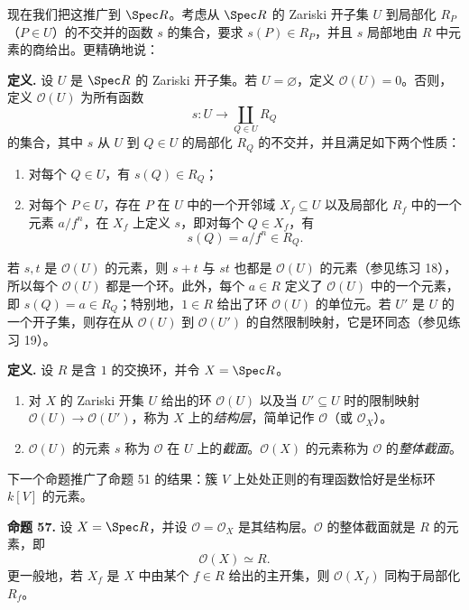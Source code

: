 现在我们把这推广到 $\Spec R$。考虑从 $\Spec R$ 的 Zariski 开子集 $U$ 到局部化 $R_P$（$P\in U$）的不交并的函数 $s$ 的集合，要求 $s(P)\in R_P$，并且 $s$ 局部地由 $R$ 中元素的商给出。更精确地说：

\noindent\textbf{定义.} 设 $U$ 是 $\Spec R$ 的 Zariski 开子集。若 $U=\varnothing$，定义 $\mathcal O(U)=0$。否则，定义 $\mathcal O(U)$ 为所有函数
\[
s:U\longrightarrow\coprod_{Q\in U}R_Q
\]
的集合，其中 $s$ 从 $U$ 到 $Q\in U$ 的局部化 $R_Q$ 的不交并，并且满足如下两个性质：
\begin{enumerate}[label=(\arabic*)]
	\item 对每个 $Q\in U$，有 $s(Q)\in R_Q$；
	\item 对每个 $P\in U$，存在 $P$ 在 $U$ 中的一个开邻域 $X_f\subseteq U$ 以及局部化 $R_f$ 中的一个元素 $a/f^n$，在 $X_f$ 上定义 $s$，即对每个 $Q\in X_f$，有
	\[
	s(Q)=a/f^n\in R_Q.
	\]
\end{enumerate}

若 $s,t$ 是 $\mathcal O(U)$ 的元素，则 $s+t$ 与 $st$ 也都是 $\mathcal O(U)$ 的元素（参见练习 18），所以每个 $\mathcal O(U)$ 都是一个环。此外，每个 $a\in R$ 定义了 $\mathcal O(U)$ 中的一个元素，即 $s(Q)=a\in R_Q$；特别地，$1\in R$ 给出了环 $\mathcal O(U)$ 的单位元。若 $U'$ 是 $U$ 的一个开子集，则存在从 $\mathcal O(U)$ 到 $\mathcal O(U')$ 的自然限制映射，它是环同态（参见练习 19）。

\noindent\textbf{定义.} 设 $R$ 是含 $1$ 的交换环，并令 $X=\Spec R$。
\begin{enumerate}[label=(\arabic*)]
	\item 对 $X$ 的 Zariski 开集 $U$ 给出的环 $\mathcal O(U)$ 以及当 $U'\subseteq U$ 时的限制映射 $\mathcal O(U)\to\mathcal O(U')$，称为 $X$ 上的\emph{结构层}，简单记作 $\mathcal O$（或 $\mathcal O_X$）。
	\item $\mathcal O(U)$ 的元素 $s$ 称为 $\mathcal O$ 在 $U$ 上的\emph{截面}。$\mathcal O(X)$ 的元素称为 $\mathcal O$ 的\emph{整体截面}。
\end{enumerate}

下一个命题推广了命题 51 的结果：簇 $V$ 上处处正则的有理函数恰好是坐标环 $k[V]$ 的元素。

\noindent\textbf{命题 57.} 设 $X=\Spec R$，并设 $\mathcal O=\mathcal O_X$ 是其结构层。$\mathcal O$ 的整体截面就是 $R$ 的元素，即
\[
\mathcal O(X)\simeq R.
\]
更一般地，若 $X_f$ 是 $X$ 中由某个 $f\in R$ 给出的主开集，则 $\mathcal O(X_f)$ 同构于局部化 $R_f$。

